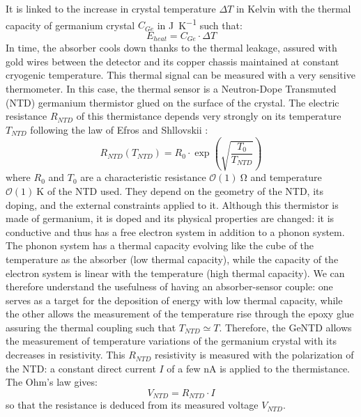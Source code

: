 It is linked to the increase in crystal temperature $\Delta T$ in Kelvin with the thermal capacity of germanium crystal $C_{Ge}$ in \si{\joule\per\kelvin} such that:
\begin{equation}
E_{heat} = C_{Ge} \cdot \Delta T
\end{equation}
In time, the absorber cools down thanks to the thermal leakage, assured with gold wires between the detector and its copper chassis maintained at constant cryogenic temperature.
This thermal signal can be measured with a very sensitive thermometer. In this case, the thermal sensor is a Neutron-Dope Transmuted (NTD) germanium thermistor glued on the surface of the crystal. The electric resistance $R_{NTD}$ of this thermistance depends very strongly on its temperature $T_{NTD}$ following the law of Efros and Shllovskii \cite{mccammon}:
\begin{equation}
\label{eq:ntd-resistivity}
R_{NTD}(T_{NTD}) = R_0 \cdot \exp(\sqrt{\frac{T_0}{T_{NTD}}})
\end{equation}
where $R_0$ and $T_0$ are a characteristic resistance $\mathcal{O}(1)\ \si{\ohm}$ and temperature $\mathcal{O}(1)\ \si{\kelvin}$ of the NTD used. They depend on the geometry of the NTD, its doping, and the external constraints applied to it. 
Although this thermistor is made of germanium, it is doped and its physical properties are changed: it is conductive and thus has a free electron system in addition to a phonon system. The phonon system has a thermal capacity evolving like the cube of the temperature as the absorber (low thermal capacity), while the capacity of the electron system is linear with the temperature (high thermal capacity). We can therefore understand the usefulness of having an absorber-sensor couple: one serves as a target for the deposition of energy with low thermal capacity, while the other allows the measurement of the temperature rise through the epoxy glue assuring the thermal coupling such that $T_{NTD} \simeq T$.
Therefore, the GeNTD allows the measurement of temperature variations of the germanium crystal with its decreases in resistivity.
This $R_{NTD}$ resistivity is measured with the polarization of the NTD: a constant direct current $I$ of a few \si{\nano\ampere} is applied to the  thermistance. The Ohm's law gives:
\begin{equation}
V_{NTD} = R_{NTD} \cdot I
\end{equation}
so that the resistance is deduced from its measured voltage $V_{NTD}$.

